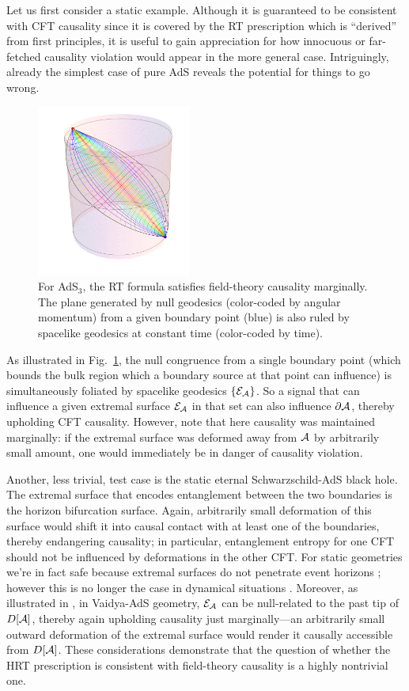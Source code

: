 \documentclass[12pt]{article}
\def\AdS#1{\AdS$_{#1}$}
\def\regA{{\cal A}}
\def\entsurf{
\partial \regA}
\def\domdA{D[\regA]}
\def\extr{{\cal E}_\regA}
\def\AdS#1{AdS$_{#1}$}
\begin{document}
Let us first consider a static example.  Although it is guaranteed to be consistent with CFT causality since it is covered by the RT prescription which is ``derived'' from first principles, it is useful to gain appreciation for how innocuous or far-fetched causality violation would appear in the more general case.
Intriguingly, already the simplest case of pure AdS reveals the potential for things to go wrong. 
\begin{figure}
\begin{center}
\includegraphics[width=2in]{AdS3geods}
\caption{
For \AdS{3}, the RT formula satisfies field-theory causality marginally. The plane generated by null geodesics (color-coded by angular momentum) from a given boundary point (blue) is also ruled by spacelike geodesics at constant time (color-coded by time).
}
\label{f:AdS3geods}
\end{center}
\end{figure}
% 
As illustrated in Fig.\ \ref{f:AdS3geods}, the null congruence from a single boundary point (which bounds the bulk region which a boundary source at that point can influence) is simultaneously foliated by spacelike geodesics $\{ \extr \}$. So a signal that can influence a given extremal surface $\extr$ in that set can also influence $\entsurf$, thereby upholding CFT causality. However, note that here causality was maintained marginally: if the extremal surface was deformed away from $\regA$ by arbitrarily small amount, one would immediately be in danger of causality violation.

Another, less trivial, test case is the static eternal Schwarzschild-AdS black hole.  The extremal surface that encodes  entanglement between the two boundaries is the horizon bifurcation surface. Again, arbitrarily small deformation of this surface would shift it into causal contact with at least one of the boundaries, thereby endangering causality; in particular, entanglement entropy for one CFT should not be influenced by deformations in the other CFT.
For static geometries we're in fact safe because extremal surfaces do not penetrate event horizons \cite{Hubeny:2012ry}; however this is no longer the case in dynamical situations \cite{Hubeny:2002dg,AbajoArrastia:2010yt,Hartman:2013qma,Liu:2013iza,Hubeny:2013dea}. 
Moreover, as illustrated in \cite{Hubeny:2013hz}, in Vaidya-AdS geometry,  $\extr$ can be null-related to the past tip of $\domdA$,  thereby again upholding causality just marginally---an arbitrarily small outward deformation of the extremal surface would render it causally accessible from $\domdA$.
These considerations demonstrate that the question of whether the HRT prescription is consistent with field-theory causality is a highly nontrivial one.  
\end{document}
